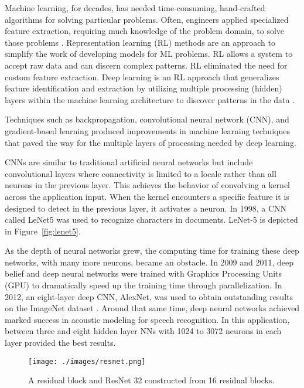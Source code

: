 Machine learning, for decades, has needed time-consuming, hand-crafted
algorithms for solving particular problems. Often, engineers applied specialized
feature extraction, requiring much knowledge of the problem domain, to solve
those problems \cite{lecun1995pattern, 726791}. Representation learning (RL)
methods are an approach to simplify the work of developing models for ML
problems. RL allows a system to accept raw data and can discern complex
patterns. RL eliminated the need for custom feature extraction. Deep learning is
an RL approach that generalizes feature identification and extraction by
utilizing multiple processing (hidden) layers within the machine learning
architecture to discover patterns in the data \cite{lecun2015deep}.


Techniques such as backpropagation\cite{6795724}, convolutional neural network
(CNN)\cite{fukushima1982neocognitron}, and gradient-based learning\cite{726791}
produced improvements in machine learning techniques that paved the way for the
multiple layers of processing needed by deep learning.

CNNs are similar to traditional artificial neural networks but include
convolutional layers where connectivity is limited to a locale rather than all
neurons in the previous layer.  This achieves the behavior of convolving a
kernel across the application input.  When the kernel encounters a specific feature
it is designed to detect in the previous layer, it activates a neuron\cite{li2021survey}.
In 1998, a CNN called LeNet5 was used to recognize characters in documents.  LeNet-5
is depicted in Figure~\ref{fig:lenet5}\cite{726791, zhang2023dive, lecun1995learning}.

As the depth of neural networks grew, the computing time for training these deep
networks, with many more neurons, became an obstacle. In 2009 and 2011, deep
belief and deep neural networks were trained with Graphics Processing Units
(GPU) to dramatically speed up the training time through
parallelization\cite{raina2009large, cirecsan2010deep}. In 2012, an eight-layer
deep CNN, AlexNet, was used to obtain outstanding results on the ImageNet
dataset \cite{krizhevsky2012imagenet}. Around that same time, deep neural
networks achieved marked success in acoustic modeling for speech recognition. In
this application, between three and eight hidden layer NNs with 1024 to 3072
neurons in each layer provided the best results\cite{hinton2012deep}.

\begin{figure}[h]
    \centering
    \texttt{[image: ./images/resnet.png]}
    \caption{A residual block and ResNet 32 constructed from 16 residual blocks\cite{7780459}.}
    \label{fig:resnet}
\end{figure}

